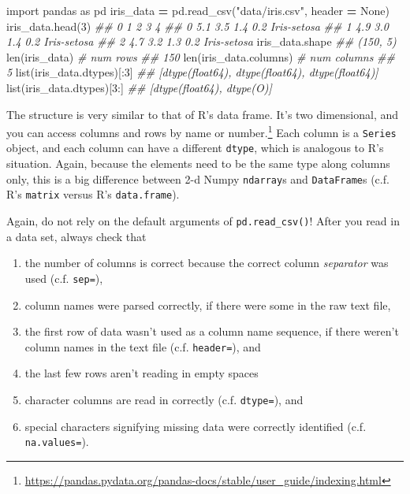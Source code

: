\documentclass[
  12pt,
  krantz2]{krantz}
\makeatletter
\newenvironment{Shaded}{\begin{snugshade}}{\end{snugshade}}
\newcommand{\BuiltInTok}[1]{#1}
\newcommand{\CommentTok}[1]{\textcolor[rgb]{0.37,0.37,0.37}{\textit{#1}}}
\newcommand{\DecValTok}[1]{\textcolor[rgb]{0.06,0.06,0.06}{#1}}
\newcommand{\ImportTok}[1]{#1}
\newcommand{\NormalTok}[1]{#1}
\newcommand{\OperatorTok}[1]{\textcolor[rgb]{0.43,0.43,0.43}{\textbf{#1}}}
\newcommand{\StringTok}[1]{\textcolor[rgb]{0.5,0.5,0.5}{#1}}
\newcommand{\VariableTok}[1]{\textcolor[rgb]{0,0,0}{#1}}
\providecommand{\tightlist}{%
  \setlength{\itemsep}{0pt}\setlength{\parskip}{0pt}}
\renewcommand{\href}[2]{#2\footnote{\url{#1}}}
\newenvironment{kframe}{%
\medskip{}
\setlength{\fboxsep}{.8em}
 \def\at@end@of@kframe{}%
 \ifinner\ifhmode%
  \def\at@end@of@kframe{\end{minipage}}%
  \begin{minipage}{\columnwidth}%
 \fi\fi%
 \def\FrameCommand##1{\hskip\@totalleftmargin \hskip-\fboxsep
 \colorbox{shadecolor}{##1}\hskip-\fboxsep
     \hskip-\linewidth \hskip-\@totalleftmargin \hskip\columnwidth}%
 \MakeFramed {\advance\hsize-\width
   \@totalleftmargin\z@ \linewidth\hsize
   \@setminipage}}%
 {\par\unskip\endMakeFramed%
 \at@end@of@kframe}
\renewenvironment{Shaded}{\begin{kframe}}{\end{kframe}}
\makeatother
\begin{document}
\begin{Shaded}
\begin{Highlighting}[]
\ImportTok{import}\NormalTok{ pandas }\ImportTok{as}\NormalTok{ pd}
\NormalTok{iris\_data }\OperatorTok{=}\NormalTok{ pd.read\_csv(}\StringTok{"data/iris.csv"}\NormalTok{, header }\OperatorTok{=} \VariableTok{None}\NormalTok{)}
\NormalTok{iris\_data.head(}\DecValTok{3}\NormalTok{)}
\CommentTok{\#\#      0    1    2    3            4}
\CommentTok{\#\# 0  5.1  3.5  1.4  0.2  Iris{-}setosa}
\CommentTok{\#\# 1  4.9  3.0  1.4  0.2  Iris{-}setosa}
\CommentTok{\#\# 2  4.7  3.2  1.3  0.2  Iris{-}setosa}
\NormalTok{iris\_data.shape}
\CommentTok{\#\# (150, 5)}
\BuiltInTok{len}\NormalTok{(iris\_data) }\CommentTok{\# num rows}
\CommentTok{\#\# 150}
\BuiltInTok{len}\NormalTok{(iris\_data.columns) }\CommentTok{\# num columns}
\CommentTok{\#\# 5}
\BuiltInTok{list}\NormalTok{(iris\_data.dtypes)[:}\DecValTok{3}\NormalTok{]}
\CommentTok{\#\# [dtype(\textquotesingle{}float64\textquotesingle{}), dtype(\textquotesingle{}float64\textquotesingle{}), dtype(\textquotesingle{}float64\textquotesingle{})]}
\BuiltInTok{list}\NormalTok{(iris\_data.dtypes)[}\DecValTok{3}\NormalTok{:]}
\CommentTok{\#\# [dtype(\textquotesingle{}float64\textquotesingle{}), dtype(\textquotesingle{}O\textquotesingle{})]}
\end{Highlighting}
\end{Shaded}

The structure is very similar to that of R's data frame. It's two dimensional, and you can \href{https://pandas.pydata.org/pandas-docs/stable/user_guide/indexing.html}{access columns and rows by name or number.} Each column is a \texttt{Series} object, and each column can have a different \texttt{dtype}, which is analogous to R's situation. Again, because the elements need to be the same type along columns only, this is a big difference between 2-d Numpy \texttt{ndarray}s and \texttt{DataFrame}s (c.f. R's \texttt{matrix} versus R's \texttt{data.frame}).

Again, do not rely on the default arguments of \texttt{pd.read\_csv()}! After you read in a data set, always check that

\begin{enumerate}
\def\labelenumi{\arabic{enumi}.}
\tightlist
\item
  the number of columns is correct because the correct column \emph{separator} was used (c.f. \texttt{sep=}),
\item
  column names were parsed correctly, if there were some in the raw text file,
\item
  the first row of data wasn't used as a column name sequence, if there weren't column names in the text file (c.f. \texttt{header=}), and
\item
  the last few rows aren't reading in empty spaces
\item
  character columns are read in correctly (c.f. \texttt{dtype=}), and
\item
  special characters signifying missing data were correctly identified (c.f. \texttt{na.values=}).
\end{enumerate}
\end{document}
